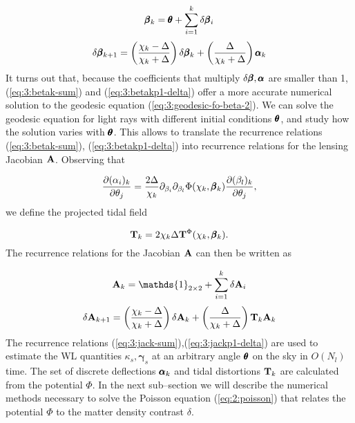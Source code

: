 \begin{equation}
\label{eq:3:betak-sum}
\pmb{\beta}_k = \pmb{\theta} + \sum_{i=1}^k\delta\pmb{\beta}_i
\end{equation}
%
\begin{equation}
\label{eq:3:betakp1-delta}
\delta\pmb{\beta}_{k+1} = \left(\frac{\chi_k-\Delta}{\chi_k+\Delta}\right)\delta\pmb{\beta}_k + \left(\frac{\Delta}{\chi_k+\Delta}\right)\pmb{\alpha}_k
\end{equation} 
%
It turns out that, because the coefficients that multiply $\delta\pmb{\beta},\pmb{\alpha}$ are smaller than 1, (\ref{eq:3:betak-sum}) and (\ref{eq:3:betakp1-delta}) offer a more accurate numerical solution to the geodesic equation (\ref{eq:3:geodesic-fo-beta-2}). We can solve the geodesic equation for light rays with different initial conditions $\pmb{\theta}$, and study how the solution varies with $\pmb{\theta}$. This allows to translate the recurrence relations (\ref{eq:3:betak-sum}), (\ref{eq:3:betakp1-delta}) into recurrence relations for the lensing Jacobian $\mathbf{A}$. Observing that 

\begin{equation}
\label{eq:3:Tk}
\frac{\partial (\alpha_i)_k}{\partial \theta_j} = \frac{2\Delta}{\chi_k}\partial_{\beta_i}\partial_{\beta_l}\Phi(\chi_k,\pmb{\beta}_k)\frac{\partial (\beta_l)_k}{\partial\theta_j},
\end{equation}
%
we define the projected tidal field 

\begin{equation}
\label{eq:3:tidal-proj}
\mathbf{T}_k = 2\chi_k\Delta\mathbf{T}^\Phi(\chi_k,\pmb{\beta}_k). 
\end{equation}
%
The recurrence relations for the Jacobian $\mathbf{A}$ can then be written as

\begin{equation}
\label{eq:3:jack-sum}
\bb{A}_k = \mathds{1}_{2\times 2} + \sum_{i=1}^k\delta\bb{A}_i
\end{equation}
%
\begin{equation}
\label{eq:3:jackp1-delta}
\delta\mathbf{A}_{k+1} = \left(\frac{\chi_k-\Delta}{\chi_k+\Delta}\right)\delta\mathbf{A}_k + \left(\frac{\Delta}{\chi_k+\Delta}\right)\mathbf{T}_k\mathbf{A}_k
\end{equation} 
%
The recurrence relations (\ref{eq:3:jack-sum}),(\ref{eq:3:jackp1-delta}) are used to estimate the WL quantities $\kappa_s,\pmb{\gamma}_s$ at an arbitrary angle $\pmb{\theta}$ on the sky in $O(N_l)$ time. The set of discrete deflections $\pmb{\alpha}_k$ and tidal distortions $\mathbf{T}_k$ are calculated from the potential $\Phi$. In the next sub--section we will describe the numerical methods necessary to solve the Poisson equation (\ref{eq:2:poisson}) that relates the potential $\Phi$ to the matter density contrast $\delta$. 

